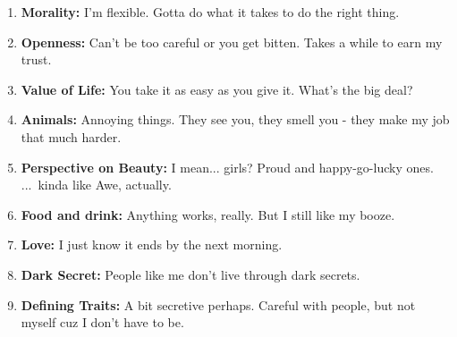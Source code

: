 \begin{enumerate}
		\textbf{Biggest Fear:}
		Golotov will poison me one day, I just know it. Or murk me in my sleep. Can't run, can't hide. Really got me by the balls.
	\item
		\textbf{Morality:}
		I'm flexible. Gotta do what it takes to do the right thing.
	\item
		\textbf{Openness:}
		Can't be too careful or you get bitten. Takes a while to earn my trust.
	\item
		\textbf{Value of Life:}
		You take it as easy as you give it. What's the big deal?
	\item
		\textbf{Animals:}
		Annoying things. They see you, they smell you - they make my job that much harder.
	\item
		\textbf{Perspective on Beauty:}
		I mean... girls?
		Proud and happy-go-lucky ones.
		\mbox{... kinda} like Awe, actually.
	\item
		\textbf{Food and drink:}
		Anything works, really.
		But I still like my booze.
	\item
		\textbf{Love:}
		I just know it ends by the next morning.
	\item
		\textbf{Dark Secret:}
		People like me don't live through dark secrets.
	\item
		\textbf{Defining Traits:}
		A bit secretive perhaps. Careful with people, but not myself cuz I don't have to be.
\end{enumerate}

